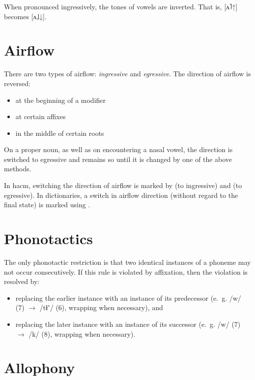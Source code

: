 \documentclass{book}
\begin{document}
When pronounced ingressively, the tones of vowels are inverted. That is, [ʌ˥↑] becomes [ʌ˩↓].

\section{Airflow}


There are two types of airflow: \emph{ingressive} and \emph{egressive}. The direction of airflow is reversed:

\begin{itemize}
  \item at the beginning of a modifier
  \item at certain affixes
  \item in the middle of certain roots
\end{itemize}

On a proper noun, as well as on encountering a nasal vowel, the direction is switched to egressive and remains so until it is changed by one of the above methods.

In hacm, switching the direction of airflow is marked by \hortho{/} (to ingressive) and \hortho{\bs} (to egressive). In dictionaries, a switch in airflow direction (without regard to the final state) is marked using \hortho{>}.

\section{Phonotactics}

The only phonotactic restriction is that two identical instances of a phoneme may not occur consecutively. If this rule is violated by affixation, then the violation is resolved by:

\begin{itemize}
  \item replacing the earlier instance with an instance of its predecessor (e.~g. /w/ (7) $\rightarrow$ /tɬʼ/ (6), wrapping when necessary), and
  \item replacing the later instance with an instance of its successor (e.~g. /w/ (7) $\rightarrow$ /k/ (8), wrapping when necessary).
\end{itemize}

\section{Allophony}
\end{document}
